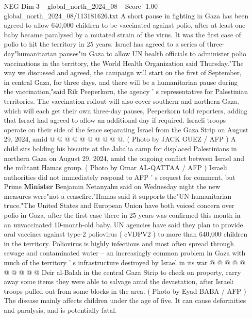 \begin{textsample}{NEG Dim 3 – global\_north\_2024\_08 – Score -1.00 – global\_north\_2024\_08/113181626.txt}  \label{ex:f3_neg_320}
A short pause in fighting in Gaza has been agreed to allow 640,000 children to be vaccinated against polio, after at least one baby became paralysed by a mutated strain of the virus.
It was the first case of polio to hit the territory in 25 years.
Israel has agreed to a series of three-day"humanitarian pauses"in Gaza to allow UN health officials to administer polio vaccinations in the territory, the World Health Organization said Thursday."The way we discussed and agreed, the campaign will start on the first of September, in central Gaza, for three days, and there will be a humanitarian pause during the vaccination,"said Rik Peeperkorn, the agency ' s representative for Palestinian territories.
The vaccination rollout will also cover southern and northern Gaza, which will each get their own three-day pauses, Peeperkorn told reporters, adding that Israel had agreed to allow an additional day if required.
Israeli troops operate on their side of the fence separating Israel from the Gaza Strip on August 29, 2024, amid @ @ @ @ @ @ @ @ @ @. ( Photo by JACK GUEZ / AFP ) A child sits holding his biscuits at the Jabalia camp for displaced Palestinians in northern Gaza on August 29, 2024, amid the ongoing conflict between Israel and the militant Hamas group. ( Photo by Omar AL-QATTAA / AFP ) Israeli authorities did not immediately respond to AFP ' s request for comment, but Prime \textbf{Minister} Benjamin Netanyahu said on Wednesday night the new measures were"not a ceasefire."Hamas said it supports the"UN humanitarian truce."The United States and European Union have both voiced concern over polio in Gaza, after the first case there in 25 years was confirmed this month in an unvaccinated 10-month-old baby.
UN agencies have said they plan to provide oral vaccines against type-2 poliovirus ( cVDPV2 ) to more than 640,000 children in the territory.
Poliovirus is highly infectious and most often spread through sewage and contaminated water -- an increasingly common problem in Gaza with much of the territory ' s infrastructure destroyed by Israel in its war @ @ @ @ @ @ @ @ @ @ Deir al-Balah in the central Gaza Strip to check on property, carry away some items they were able to salvage amid the devastation, after Israeli troops pulled out from some blocks in the area. ( Photo by Eyad BABA / AFP ) The disease mainly affects children under the age of five.
It can cause deformities and paralysis, and is potentially fatal.

\end{textsample}
